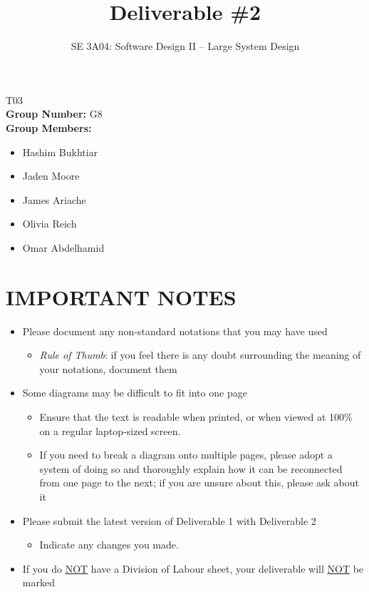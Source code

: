 \documentclass[]{article}
\title{Deliverable \#2}
\author{SE 3A04: Software Design II -- Large System Design}
\date{}
\begin{document}
\maketitle	
{} T03\\
{\bf Group Number:} G8 \\
{\bf Group Members:} 
\begin{itemize}
	\item Hashim Bukhtiar
	\item Jaden Moore
	\item James Ariache
	\item Olivia Reich
	\item Omar Abdelhamid
\end{itemize}

\section*{IMPORTANT NOTES}
\begin{itemize}
	\item Please document any non-standard notations that you may have used
	\begin{itemize}
		\item \emph{Rule of Thumb}: if you feel there is any doubt surrounding the meaning of your notations, document them
	\end{itemize}
	\item Some diagrams may be difficult to fit into one page
	\begin{itemize}
		\item Ensure that the text is readable when printed, or when viewed at 100\% on a regular laptop-sized screen.
		\item If you need to break a diagram onto multiple pages, please adopt a system of doing so and thoroughly explain how it can be reconnected from one page to the next; if you are unsure about this, please ask about it
	\end{itemize}
	\item Please submit the latest version of Deliverable 1 with Deliverable 2
	\begin{itemize}
		\item Indicate any changes you made.
	\end{itemize}
	\item If you do \underline{NOT} have a Division of Labour sheet, your deliverable will \underline{NOT} be marked
\end{itemize}
\end{document}
